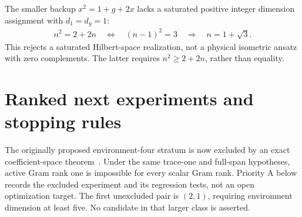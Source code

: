 \documentclass[aps,pra,reprint,nofootinbib,onecolumn]{revtex4-2}
\begin{document}
The smaller backup $x^2=1+g+2x$ lacks a saturated positive integer
dimension assignment with $d_1=d_g=1$:
\begin{align}
	n^2=2+2n
	\quad\Longleftrightarrow\quad
	(n-1)^2=3
	\quad\Longrightarrow\quad n=1+\sqrt3.
\end{align}
This rejects a saturated Hilbert-space realization, not a physical
isometric ansatz with zero complements. The latter requires
$n^2\geq2+2n$, rather than equality.

\section{Ranked next experiments and stopping rules}
\label{sec:experiments}

The originally proposed environment-four stratum is now excluded by
an exact coefficient-space theorem~\cite{EnvironmentFour}. Under the
same trace-one and full-span hypotheses, active Gram rank one is
impossible for every scalar Gram rank. Priority A below records the
excluded experiment and its regression tests, not an open optimization
target. The first unexcluded pair is $(2,1)$, requiring environment
dimension at least five. No candidate in that larger class is asserted.
\end{document}
